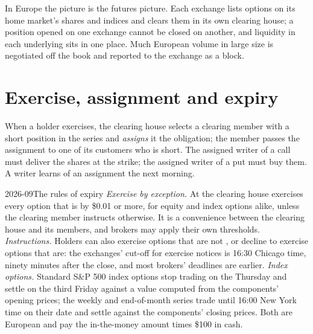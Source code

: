 In Europe the picture is the futures picture. Each exchange lists options on
its home market's shares and indices and clears them in its own clearing
house; a position opened on one exchange cannot be closed on another, and
liquidity in each underlying sits in one place. Much European volume in
large size is negotiated off the book and reported to the exchange as a
block.

\section{Exercise, assignment and expiry}

\begin{definition}[Assignment]\label{def:m1:option-contracts-and-exchanges:assignment}
When a holder exercises, the clearing house selects a clearing member with a
short position in the series and \emph{assigns} it the
obligation; the member passes the assignment to one of its customers who is
short. The assigned writer of a call must deliver the shares at the strike;
the assigned writer of a put must buy them. A writer learns of an
assignment the next morning.
\end{definition}

\begin{dated}{2026-09}{The rules of expiry}\label{dat:m1:option-contracts-and-exchanges:expiry}
\emph{Exercise by exception.} At  the clearing house exercises every
option that is  by \$0.01 or more, for equity and index options
alike, unless the clearing member instructs otherwise. It is a convenience
between the clearing house and its members, and brokers may apply their own
thresholds. \emph{Instructions.} Holders can also exercise options that are
not , or decline to exercise options that are: the exchanges'
cut-off for exercise notices is 16:30 Chicago time, ninety minutes after the
close, and most brokers' deadlines are earlier. \emph{Index options.}
Standard S\&P 500 index options stop trading on the Thursday and settle on
the third Friday against a value computed from the components' opening
prices; the weekly and end-of-month series trade until 16:00 New York time
on their  date and settle against the components' closing prices.
Both are European and pay the in-the-money amount times \$100 in cash.
\end{dated}

